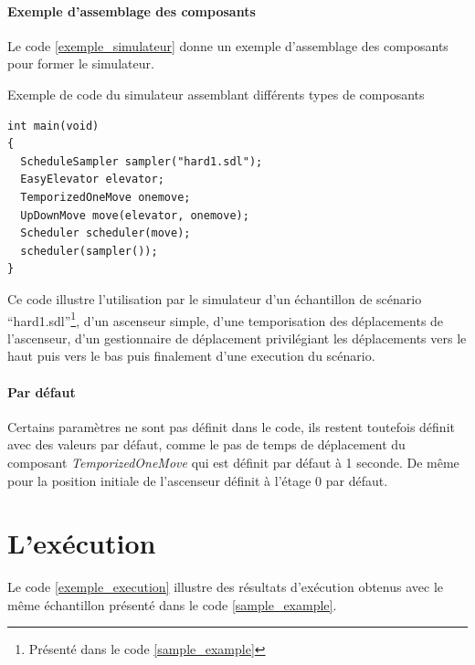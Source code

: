 \documentclass[twocolumn,oneside,10pt]{article}
\begin{document}
\paragraph{Exemple d'assemblage des composants}

Le code \ref{exemple_simulateur} donne un exemple d'assemblage des composants pour former le simulateur.

\begin{algorithm}[h]
  \caption{Exemple de code du simulateur assemblant différents types de composants}
  \label{exemple_simulateur}
\begin{verbatim}
int main(void)
{
  ScheduleSampler sampler("hard1.sdl");
  EasyElevator elevator;
  TemporizedOneMove onemove;
  UpDownMove move(elevator, onemove);
  Scheduler scheduler(move);
  scheduler(sampler());
}
\end{verbatim}
\end{algorithm}

Ce code illustre l'utilisation par le simulateur d'un échantillon de scénario ``hard1.sdl''\footnote{Présenté dans le code \ref{sample_example}}, d'un ascenseur simple, d'une temporisation des déplacements de l'ascenseur, d'un gestionnaire de déplacement privilégiant les déplacements vers le haut puis vers le bas puis finalement d'une execution du scénario.

\paragraph{Par défaut}

Certains paramètres ne sont pas définit dans le code, ils restent toutefois définit avec des valeurs par défaut, comme le pas de temps de déplacement du composant {\em TemporizedOneMove} qui est définit par défaut à 1 seconde. De même pour la position initiale de l'ascenseur définit à l'étage 0 par défaut.

\section{L'exécution}

Le code \ref{exemple_execution} illustre des résultats d'exécution obtenus avec le même échantillon présenté dans le code \ref{sample_example}.
\end{document}
